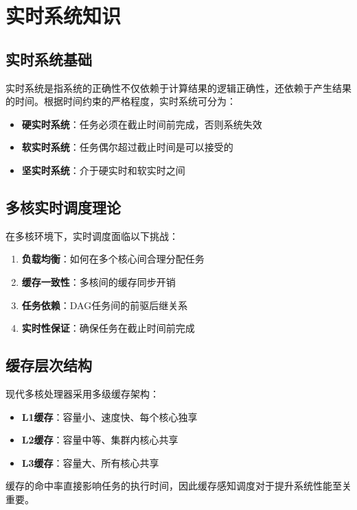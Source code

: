 
\section{实时系统知识} \label{sec:realtime}

\subsection{实时系统基础}

实时系统是指系统的正确性不仅依赖于计算结果的逻辑正确性，还依赖于产生结果的时间。根据时间约束的严格程度，实时系统可分为：

\begin{itemize}
    \item \textbf{硬实时系统}：任务必须在截止时间前完成，否则系统失效
    \item \textbf{软实时系统}：任务偶尔超过截止时间是可以接受的
    \item \textbf{坚实时系统}：介于硬实时和软实时之间
\end{itemize}

\subsection{多核实时调度理论}

在多核环境下，实时调度面临以下挑战：

\begin{enumerate}
    \item \textbf{负载均衡}：如何在多个核心间合理分配任务
    \item \textbf{缓存一致性}：多核间的缓存同步开销
    \item \textbf{任务依赖}：DAG任务间的前驱后继关系
    \item \textbf{实时性保证}：确保任务在截止时间前完成
\end{enumerate}

\subsection{缓存层次结构}

现代多核处理器采用多级缓存架构：

\begin{itemize}
    \item \textbf{L1缓存}：容量小、速度快、每个核心独享
    \item \textbf{L2缓存}：容量中等、集群内核心共享
    \item \textbf{L3缓存}：容量大、所有核心共享
\end{itemize}

缓存的命中率直接影响任务的执行时间，因此缓存感知调度对于提升系统性能至关重要。
